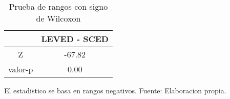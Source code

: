 \begin{table}[H]
\centering
\begin{tabular}{c|c|}
\cline{2-2}
                              & LEVED - SCED \\ \hline
\multicolumn{1}{|c|}{Z}       & -67.82          \\ \hline
\multicolumn{1}{|c|}{valor-p} & 0.00           \\ \hline
\end{tabular}
\caption{Prueba de rangos con signo de Wilcoxon}
El estadistico  se basa en rangos negativos.
Fuente: Elaboracion propia.
\label{wilTable}
\end{table}
